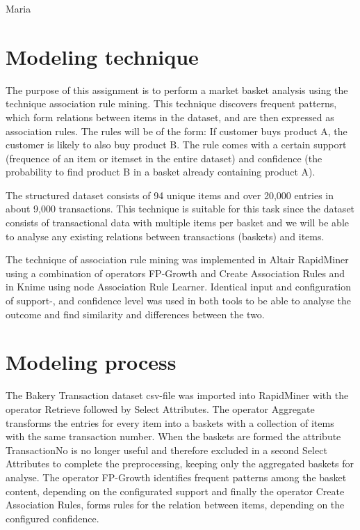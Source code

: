\label{chap:modeling}

Maria


\section{Modeling technique}
The purpose of this assignment is to perform a market basket analysis using the technique
association rule mining. This technique discovers frequent patterns, which form relations
between items in the dataset, and are then expressed as association rules. The rules will
be of the form: If customer buys product A, the customer is likely to also buy product B.
The rule comes with a certain support (frequence of an item or itemset in the entire dataset)
and confidence (the probability to find product B in a basket already containing product A).

The structured dataset consists of 94 unique items and over 20,000 entries in about 9,000 transactions.
This technique is suitable for this task since the dataset consists of transactional data with
multiple items per basket and we will be able to analyse any existing relations between
transactions (baskets) and items. 

The technique of association rule mining was implemented in Altair RapidMiner using a combination
of operators FP-Growth and Create Association Rules and in Knime using node Association Rule Learner.
Identical input and configuration of support-, and confidence level was used in both tools to be
able to analyse the outcome and find similarity and differences between the two.

\section{Modeling process}
The Bakery Transaction dataset csv-file was imported into RapidMiner with the operator Retrieve
followed by Select Attributes. The operator Aggregate transforms the entries for every item into
a baskets with a collection of items with the same transaction number. When the baskets are formed
the attribute TransactionNo is no longer useful and therefore excluded in a second Select Attributes
to complete the preprocessing, keeping only the aggregated baskets for analyse. The operator FP-Growth
identifies frequent patterns among the basket content, depending on the configurated support and
finally the operator Create Association Rules, forms rules for the relation between items, depending
on the configured confidence.

